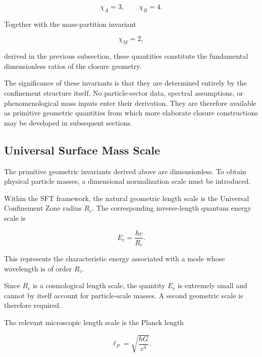 \documentclass[11pt]{article}
\theoremstyle{definition}
\theoremstyle{remark}
\begin{document}
\begin{equation}
\chi_A=3,
\qquad
\chi_B=4.
\end{equation}

Together with the mass-partition invariant

\begin{equation}
\chi_M=2,
\end{equation}

derived in the previous subsection, these quantities constitute
the fundamental dimensionless ratios of the closure geometry.

The significance of these invariants is that they are determined
entirely by the confinement structure itself. No particle-sector
data, spectral assumptions, or phenomenological mass inputs enter
their derivation. They are therefore available as primitive
geometric quantities from which more elaborate closure
constructions may be developed in subsequent sections.


\subsection{Universal Surface Mass Scale}
\label{subsec:universal_surface_mass_scale}

The primitive geometric invariants derived above are dimensionless.
To obtain physical particle masses, a dimensional normalization scale
must be introduced.

Within the SFT framework, the natural geometric length scale is the
Universal Confinement Zone radius \(R_c\). The corresponding inverse-length
quantum energy scale is

\begin{equation}
E_c = \frac{\hbar c}{R_c}.
\label{eq:Ec}
\end{equation}

This represents the characteristic energy associated with a mode whose
wavelength is of order \(R_c\).

Since \(R_c\) is a cosmological length scale, the quantity \(E_c\) is
extremely small and cannot by itself account for particle-scale masses.
A second geometric scale is therefore required.

The relevant microscopic length scale is the Planck length

\begin{equation}
\ell_P = \sqrt{\frac{\hbar G}{c^3}}.
\label{eq:PlanckLength}
\end{equation}
\end{document}
